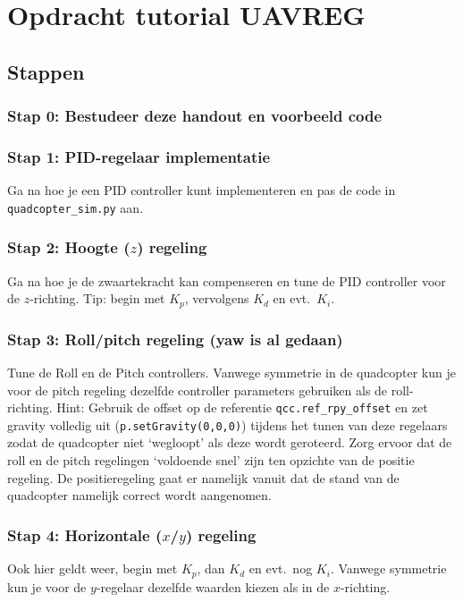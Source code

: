 \documentclass[a4paper,11pt]{article}
\begin{document}
\section{Opdracht tutorial UAVREG}
\label{sec:opdracht}
\subsection{Stappen}
\subsubsection{Stap 0: Bestudeer deze handout en voorbeeld code}
\subsubsection{Stap 1: PID-regelaar implementatie}
Ga na hoe je een PID controller kunt implementeren en pas de code in
\texttt{quadcopter\_sim.py} aan.
 
\subsubsection{Stap 2: Hoogte ($z$) regeling}
\label{sec:hoogte}
Ga na hoe je de zwaartekracht kan compenseren en tune de PID controller voor de $z$-richting. Tip: begin met $K_p$, vervolgens $K_d$ en evt.\ $K_i$.

\subsubsection{Stap 3: Roll/pitch regeling (yaw is al gedaan)}
\label{sec:rollpitch}
Tune de Roll en de Pitch controllers. Vanwege symmetrie in de quadcopter kun je voor de pitch regeling dezelfde controller parameters gebruiken als de roll-richting. Hint: Gebruik de offset op de referentie \texttt{qcc.ref\_rpy\_offset} en zet gravity volledig uit (\texttt{p.setGravity(0,0,0)}) tijdens het tunen van deze regelaars zodat de quadcopter niet `wegloopt'  als deze wordt geroteerd.
Zorg ervoor dat de roll en de pitch regelingen `voldoende snel' zijn ten opzichte van de positie regeling. De positieregeling gaat er namelijk vanuit dat de stand van de quadcopter namelijk correct wordt aangenomen. 

\subsubsection{Stap 4: Horizontale ($x$/$y$) regeling}
\label{sec:horizontaal}
Ook hier geldt weer, begin met $K_p$, dan $K_d$ en evt.\ nog $K_i$. Vanwege symmetrie kun je voor de $y$-regelaar dezelfde waarden kiezen als in de $x$-richting. 
\end{document}
